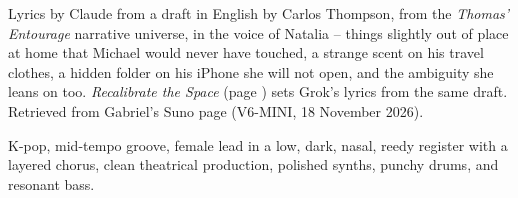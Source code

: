 
\label{sec:blurry-line}
\begin{notes}
Lyrics by Claude from a draft in English by Carlos Thompson, from the \emph{Thomas' Entourage} narrative universe, in the voice of Natalia -- things slightly out of place at home that Michael would never have touched, a strange scent on his travel clothes, a hidden folder on his iPhone she will not open, and the ambiguity she leans on too. \emph{Recalibrate the Space} (page \pageref{sec:recalibrate-the-space}) sets Grok's lyrics from the same draft. Retrieved from Gabriel's Suno page (V6-MINI, 18 November 2026).
\end{notes}
\begin{style}
K-pop, mid-tempo groove, female lead in a low, dark, nasal, reedy register with a layered chorus, clean theatrical production, polished synths, punchy drums, and resonant bass.
\end{style}
